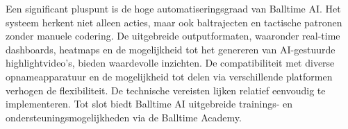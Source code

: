 Een significant pluspunt is de hoge automatiseringsgraad van Balltime AI. Het systeem herkent niet alleen acties, maar ook baltrajecten en tactische patronen zonder manuele codering. De uitgebreide outputformaten, waaronder real-time dashboards, heatmaps en de mogelijkheid tot het genereren van AI-gestuurde highlightvideo's, bieden waardevolle inzichten. De compatibiliteit met diverse opnameapparatuur en de mogelijkheid tot delen via verschillende platformen verhogen de flexibiliteit. De technische vereisten lijken relatief eenvoudig te implementeren. Tot slot biedt Balltime AI uitgebreide trainings- en ondersteuningsmogelijkheden via de Balltime Academy.
